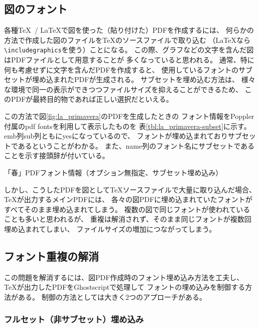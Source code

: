 \documentclass[twocolumn,jafontscale=0.962216,jlreq_notes]{jlreq}
\begin{document}
\subsection{図のフォント}

各種\TeX ~/ \LaTeX で図を使った（貼り付けた）PDFを作成するには、
何らかの方法で作成した図のファイルを\TeX のソースファイルで取り込む
（\LaTeX なら\verb|\includegraphics|を使う）ことになる。
この際、グラフなどの文字を含んだ図はPDFファイルとして用意することが
多くなっていると思われる。
通常、特に何も考慮せずに文字を含んだPDFを作成すると、
使用しているフォントのサブセットが埋め込まれたPDFが生成される。
サブセットを埋め込む方法は、
様々な環境で同一の表示ができつつファイルサイズを抑えることができるため、
このPDFが最終目的物であれば正しい選択だといえる。

この方法で図\ref{fig:la_primavera}のPDFを生成したときの
フォント情報をPoppler \cite{poppler}付属のpdf\textcompwordmark
fontsを利用して表示したものを
表\ref{tbl:la_primavera-subset}に示す。emb列sub列ともにyesになっているので、
フォントが埋め込まれておりサブセットであるということがわかる。
また、name列のフォント名にサブセットであることを示す接頭辞が付いている。

\begin{table}
  \centering
  \caption{「春」PDFフォント情報（オプション無指定、サブセット埋め込み）}
  \label{tbl:la_primavera-subset}
\end{table}

しかし、こうしたPDFを図として\TeX ソースファイルで大量に取り込んだ場合、
\TeX が出力するメインPDFには、
各々の図PDFに埋め込まれていたフォントがすべてそのまま埋め込まれてしまう。
複数の図で同じフォントが使われていることも多いと思われるが、
重複は解消されず、そのまま同じフォントが複数回埋め込まれてしまい、
ファイルサイズの増加につながってしまう。

\subsection{フォント重複の解消}

この問題を解消するには、図PDF作成時のフォント埋め込み方法を工夫し、
\TeX が出力したPDFをGhostscriptで処理して
フォントの埋め込みを制御する方法がある。
制御の方法としては大きく2つのアプローチがある。

\subsubsection{フルセット（非サブセット）埋め込み}
\end{document}
